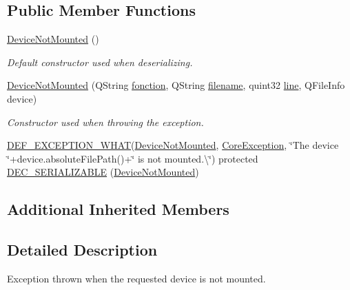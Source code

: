 \subsection*{Public Member Functions}
\begin{DoxyCompactItemize}
\item 
\hyperlink{class_gost_crypt_1_1_core_1_1_device_not_mounted_a53c2a4480579af03d2b438773988b041}{Device\+Not\+Mounted} ()
\begin{DoxyCompactList}\small\item\em Default constructor used when deserializing. \end{DoxyCompactList}\item 
\hyperlink{class_gost_crypt_1_1_core_1_1_device_not_mounted_a7ced0c94a565de87dc6c15a64424cf60}{Device\+Not\+Mounted} (Q\+String \hyperlink{class_gost_crypt_1_1_gost_crypt_exception_a29b8c93d5efbb1ff369107385725a939}{fonction}, Q\+String \hyperlink{class_gost_crypt_1_1_gost_crypt_exception_a749a12375f4ba9d502623b99d8252f38}{filename}, quint32 \hyperlink{class_gost_crypt_1_1_gost_crypt_exception_abf506d911f12a4e969eea500f90bd32c}{line}, Q\+File\+Info device)
\begin{DoxyCompactList}\small\item\em Constructor used when throwing the exception. \end{DoxyCompactList}\item 
\hyperlink{_gost_crypt_exception_8h_a5bc1e1c6c9d6f46c84eeba49e33355f9}{D\+E\+F\+\_\+\+E\+X\+C\+E\+P\+T\+I\+O\+N\+\_\+\+W\+H\+AT}(\hyperlink{class_gost_crypt_1_1_core_1_1_device_not_mounted}{Device\+Not\+Mounted}, \hyperlink{class_gost_crypt_1_1_core_1_1_core_exception}{Core\+Exception}, \char`\"{}The device \char`\"{}+device.\+absolute\+File\+Path()+\char`\"{} is not mounted.\textbackslash{}\char`\"{}) protected \hyperlink{class_gost_crypt_1_1_core_1_1_device_not_mounted_a9ddd8c18033f441237b307cf953ad3e7}{D\+E\+C\+\_\+\+S\+E\+R\+I\+A\+L\+I\+Z\+A\+B\+LE} (\hyperlink{class_gost_crypt_1_1_core_1_1_device_not_mounted}{Device\+Not\+Mounted})
\end{DoxyCompactItemize}
\subsection*{Additional Inherited Members}


\subsection{Detailed Description}
Exception thrown when the requested device is not mounted. 

